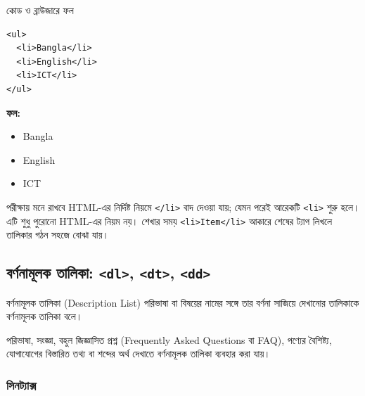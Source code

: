 \begin{chFourWholeExample}{কোড ও ব্রাউজারে ফল}
\noindent
\begin{minipage}[t]{.50\linewidth}\vspace{0pt}

\begin{verbatim}
<ul>
  <li>Bangla</li>
  <li>English</li>
  <li>ICT</li>
</ul>
\end{verbatim}

\end{minipage}\hfill
\begin{minipage}[t]{.46\linewidth}\vspace{0pt}
\textbf{ফল:}
\begin{itemize}
\item Bangla
\item English
\item ICT
\end{itemize}
\end{minipage}
\end{chFourWholeExample}

\begin{keypointbox}{পরীক্ষায় মনে রাখবে}
HTML-এর নির্দিষ্ট নিয়মে \texttt{</li>} বাদ দেওয়া যায়; যেমন পরেই আরেকটি \texttt{<li>} শুরু হলে। এটি শুধু পুরোনো HTML-এর নিয়ম নয়। শেখার সময় \texttt{<li>Item</li>} আকারে শেষের ট্যাগ লিখলে তালিকার গঠন সহজে বোঝা যায়।
\end{keypointbox}

\subsection{বর্ণনামূলক তালিকা: \texttt{<dl>}, \texttt{<dt>}, \texttt{<dd>}}

\begin{definitionbox}{বর্ণনামূলক তালিকা (Description List)}
পরিভাষা বা বিষয়ের নামের সঙ্গে তার বর্ণনা সাজিয়ে দেখানোর তালিকাকে বর্ণনামূলক তালিকা বলে।
\end{definitionbox}

পরিভাষা, সংজ্ঞা, বহুল জিজ্ঞাসিত প্রশ্ন (Frequently Asked Questions বা FAQ), পণ্যের বৈশিষ্ট্য, যোগাযোগের বিস্তারিত তথ্য বা শব্দের অর্থ দেখাতে বর্ণনামূলক তালিকা ব্যবহার করা যায়।

\subsubsection{সিনট্যাক্স}

